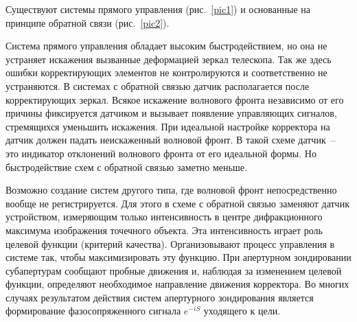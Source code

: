 \documentclass[pscyr,titlepage]{hedreport}
\newcommand{\pic}[1]{\ref{pic#1}}
\begin{document}
Существуют системы прямого управления (рис.~\pic{1}) и основанные на принципе
обратной связи (рис.~\pic{2}).

Система прямого управления обладает высоким быстродействием, но она не устраняет
искажения вызванные деформацией зеркал телескопа. Так же здесь ошибки
корректирующих элементов не контролируются и соответственно не устраняются. В
системах с обратной связью датчик располагается после корректирующих зеркал.
Всякое искажение волнового фронта независимо от его причины фиксируется датчиком
и вызывает появление управляющих сигналов, стремящихся уменьшить искажения. При
идеальной настройке корректора на датчик должен падать неискаженный волновой
фронт. В такой схеме датчик~-- это индикатор отклонений волнового фронта от его
идеальной формы. Но быстродействие схем с обратной связью заметно меньше.

Возможно создание систем другого типа, где волновой фронт непосредственно вообще
не регистрируется. Для этого в схеме с обратной связью заменяют датчик
устройством, измеряющим только интенсивность в центре дифракционного максимума
изображения точечного объекта. Эта интенсивность играет роль целевой функции
(критерий качества). Организовывают процесс управления в системе так, чтобы
максимизировать эту функцию. При апертурном зондировании субапертурам сообщают
пробные движения и, наблюдая за изменением целевой функции, определяют
необходимое направление движения корректора. Во многих случаях результатом
действия систем апертурного зондирования является формирование фазосопряженного
сигнала \( e^{-iS} \) уходящего к цели.
\end{document}
